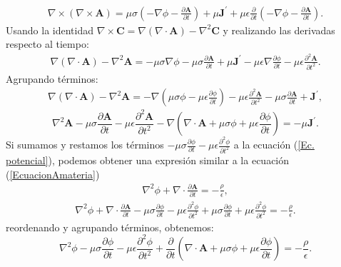 \documentclass[11pt,fleqn]{book} %
\begin{document}
\begin{eqnarray*}
\nabla \times (\nabla\times\textbf{A})=\mu\sigma\left(-\nabla\phi-\frac{\partial \textbf{A}}{\partial t}\right)+\mu\textbf{J}^{'}+\mu\epsilon\frac{\partial}{\partial t} \left(-\nabla\phi-\frac{\partial \textbf{A}}{\partial t}\right).
\end{eqnarray*}
Usando la identidad $\nabla\times\textbf{C}=\nabla(\nabla\cdot\textbf{A})-\nabla^{2}\textbf{C}$ y realizando las derivadas respecto al tiempo:
\begin{eqnarray*}
\nabla(\nabla\cdot\textbf{A})-\nabla^{2}\textbf{A}=-\mu\sigma\nabla\phi-\mu\sigma\frac{\partial \textbf{A}}{\partial t}+\mu\textbf{J}^{'}-\mu\epsilon\nabla\frac{\partial \phi}{\partial t}-\mu\epsilon\frac{\partial^{2} \textbf{A}}{\partial t^{2}}.
\end{eqnarray*}
 Agrupando t\'erminos:
\begin{eqnarray*}
\nabla(\nabla\cdot\textbf{A})-\nabla^{2}\textbf{A}=-\nabla\left(\mu\sigma\phi-\mu\epsilon\frac{\partial \phi}{\partial t}\right)-\mu\epsilon\frac{\partial^{2} \textbf{A}}{\partial t^{2}}-\mu\sigma\frac{\partial \textbf{A}}{\partial t}+\textbf{J}^{'},
\end{eqnarray*}
\begin{equation}
\nabla^{2}\textbf{A}-\mu\sigma\frac{\partial \textbf{A}}{\partial t}-\mu\epsilon\frac{\partial^{2} \textbf{A}}{\partial t^{2}}-\nabla\left(\nabla\cdot\textbf{A}+\mu\sigma\phi+\mu\epsilon\frac{\partial \phi}{\partial t}\right)=-\mu\textbf{J}^{'}. \label{EcuacionAmateria}
\end{equation}
Si sumamos y restamos los t\'erminos $-\mu\sigma\frac{\partial \phi}{\partial t}-\mu\epsilon\frac{\partial^{2} \phi}{\partial t^{2}}$ a la ecuaci\'on (\ref{Ec. potencial}), podemos obtener una expresi\'on similar a la ecuaci\'on (\ref{EcuacionAmateria})
\begin{eqnarray*}
\nabla^{2}\phi+\nabla\cdot\frac{\partial \textbf{A}}{\partial t}=-\frac{\rho}{\epsilon},
\end{eqnarray*}
\begin{eqnarray*}
\nabla^{2}\phi+\nabla\cdot\frac{\partial \textbf{A}}{\partial t}-\mu\sigma\frac{\partial \phi}{\partial t}-\mu\epsilon\frac{\partial^{2} \phi}{\partial t^{2}}+\mu\sigma\frac{\partial \phi}{\partial t}+\mu\epsilon\frac{\partial^{2} \phi}{\partial t^{2}}=-\frac{\rho}{\epsilon}.
\end{eqnarray*}
reordenando y agrupando t\'erminos, obtenemos:
\begin{equation}
\nabla^{2}\phi-\mu\sigma\frac{\partial \phi}{\partial t}-\mu\epsilon\frac{\partial^{2} \phi}{\partial t^{2}}+\frac{\partial}{\partial t}\left(\nabla\cdot\textbf{A}+\mu\sigma\phi+\mu\epsilon\frac{\partial \phi}{\partial t}\right)=-\frac{\rho}{\epsilon}. \label{Ec. Potencial materia}
\end{equation}
\end{document}
